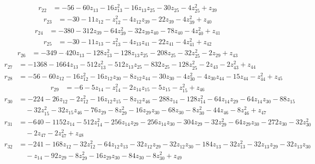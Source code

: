 \begin{align*}
r_{22} &= -56 - 60z_{13} - 16z_{13}^{2} - 16z_{13}z_{25} - 30z_{25} - 4z_{25}^{2} + z_{39}
\end{align*}
\begin{align*}
r_{23} &= -30 - 11z_{12} - z_{12}^{2} - 4z_{12}z_{39} - 22z_{39} - 4z_{39}^{2} + z_{40}
\end{align*}
\begin{align*}
r_{24} &= -380 - 312z_{39} - 64z_{39}^{2} - 32z_{39}z_{40} - 78z_{40} - 4z_{40}^{2} + z_{41}
\end{align*}
\begin{align*}
r_{25} &= -30 - 11z_{13} - z_{13}^{2} - 4z_{13}z_{41} - 22z_{41} - 4z_{41}^{2} + z_{42}
\end{align*}
\begin{align*}
r_{26} &= -349 - 420z_{13} - 128z_{13}^{2} - 128z_{13}z_{25} - 208z_{25} - 32z_{25}^{2} - 2z_{29} + z_{43}
\end{align*}
\begin{align*}
r_{27} &= -1368 - 1664z_{13} - 512z_{13}^{2} - 512z_{13}z_{25} - 832z_{25} - 128z_{25}^{2} - 2z_{43} - 2z_{43}^{2} + z_{44}
\end{align*}
\begin{align*}
r_{28} &= -56 - 60z_{12} - 16z_{12}^{2} - 16z_{12}z_{30} - 8z_{12}z_{44} - 30z_{30} - 4z_{30}^{2} - 4z_{30}z_{44} - 15z_{44} - z_{44}^{2} + z_{45}
\end{align*}
\begin{align*}
r_{29} &= -6 - 5z_{14} - z_{14}^{2} - 2z_{14}z_{15} - 5z_{15} - z_{15}^{2} + z_{46}
\end{align*}
\begin{align*}
r_{30} &= -224 - 26z_{12} - 2z_{12}^{2} - 16z_{12}z_{15} - 8z_{12}z_{46} - 288z_{14} - 128z_{14}^{2} - 64z_{14}z_{29} - 64z_{14}z_{30} - 88z_{15} \\
&\quad  - 32z_{15}^{2} - 32z_{15}z_{46} - 76z_{29} - 8z_{29}^{2} - 16z_{29}z_{30} - 68z_{30} - 8z_{30}^{2} - 44z_{46} - 8z_{46}^{2} + z_{47}
\end{align*}
\begin{align*}
r_{31} &= -640 - 1152z_{14} - 512z_{14}^{2} - 256z_{14}z_{29} - 256z_{14}z_{30} - 304z_{29} - 32z_{29}^{2} - 64z_{29}z_{30} - 272z_{30} - 32z_{30}^{2} \\
&\quad  - 2z_{47} - 2z_{47}^{2} + z_{48}
\end{align*}
\begin{align*}
r_{32} &= -241 - 168z_{12} - 32z_{12}^{2} - 64z_{12}z_{13} - 32z_{12}z_{29} - 32z_{12}z_{30} - 184z_{13} - 32z_{13}^{2} - 32z_{13}z_{29} - 32z_{13}z_{30} \\
&\quad  - z_{14} - 92z_{29} - 8z_{29}^{2} - 16z_{29}z_{30} - 84z_{30} - 8z_{30}^{2} + z_{49}
\end{align*}
